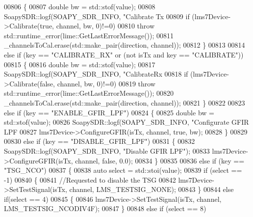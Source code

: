 \begin{DoxyCode}
{{{{{{{{{{{{{{00806     \{
00807         \textcolor{keywordtype}{double} bw = std::stof(value);
00808         SoapySDR::logf(SOAPY\_SDR\_INFO, \textcolor{stringliteral}{"Calibrate Tx %
00809         \textcolor{keywordflow}{if} (lms7Device->Calibrate(\textcolor{keyword}{true}, channel, bw, 0)!=0)
00810             \textcolor{keywordflow}{throw} std::runtime\_error(lime::GetLastErrorMessage());
00811         _channelsToCal.erase(std::make\_pair(direction, channel));
00812     \}
00813 
00814     \textcolor{keywordflow}{else} \textcolor{keywordflow}{if} (key == \textcolor{stringliteral}{"CALIBRATE\_RX"} or (not isTx and key == \textcolor{stringliteral}{"CALIBRATE"}))
00815     \{
00816         \textcolor{keywordtype}{double} bw = std::stof(value);
00817         SoapySDR::logf(SOAPY\_SDR\_INFO, \textcolor{stringliteral}{"CalibrateRx %
00818         \textcolor{keywordflow}{if} (lms7Device->Calibrate(\textcolor{keyword}{false}, channel, bw, 0)!=0)
00819             \textcolor{keywordflow}{throw} std::runtime\_error(lime::GetLastErrorMessage());
00820         _channelsToCal.erase(std::make\_pair(direction, channel));
00821     \}
00822 
00823     \textcolor{keywordflow}{else} \textcolor{keywordflow}{if} (key == \textcolor{stringliteral}{"ENABLE\_GFIR\_LPF"})
00824     \{
00825         \textcolor{keywordtype}{double} bw = std::stof(value);
00826         SoapySDR::logf(SOAPY\_SDR\_INFO, \textcolor{stringliteral}{"Configurate GFIR LPF %
00827         lms7Device->ConfigureGFIR(isTx, channel, \textcolor{keyword}{true}, bw);
00828     \}
00829 
00830     \textcolor{keywordflow}{else} \textcolor{keywordflow}{if}  (key == \textcolor{stringliteral}{"DISABLE\_GFIR\_LPF"})
00831     \{
00832         SoapySDR::logf(SOAPY\_SDR\_INFO, \textcolor{stringliteral}{"Disable GFIR LPF"});
00833         lms7Device->ConfigureGFIR(isTx, channel, \textcolor{keyword}{false}, 0.0);
00834     \}
00835 
00836     \textcolor{keywordflow}{else} \textcolor{keywordflow}{if} (key == \textcolor{stringliteral}{"TSG\_NCO"})
00837     \{
00838         \textcolor{keyword}{auto} select = std::stoi(value);
00839         \textcolor{keywordflow}{if} (select == -1)
00840         \{
00841             \textcolor{comment}{//Requested to disable the TSG}
00842             lms7Device->SetTestSignal(isTx, channel, LMS_TESTSIG_NONE);
00843         \}
00844         \textcolor{keywordflow}{else} \textcolor{keywordflow}{if}(select == 4)
00845         \{
00846             lms7Device->SetTestSignal(isTx, channel, LMS_TESTSIG_NCODIV4F);
00847         \}
00848         \textcolor{keywordflow}{else} \textcolor{keywordflow}{if} (select == 8)
}}}}}}}}}}}}}}}}}
\end{DoxyCode}
